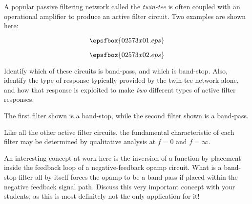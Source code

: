 

A popular passive filtering network called the {\it twin-tee} is often coupled with an operational amplifier to produce an active filter circuit.  Two examples are shown here:

$$\epsfbox{02573x01.eps}$$

$$\epsfbox{02573x02.eps}$$

Identify which of these circuits is band-pass, and which is band-stop.  Also, identify the type of response typically provided by the twin-tee network alone, and how that response is exploited to make {\it two} different types of active filter responses.







The first filter shown is a band-stop, while the second filter shown is a band-pass.







Like all the other active filter circuits, the fundamental characteristic of each filter may be determined by qualitative analysis at $f = 0$ and $f = \infty$.

An interesting concept at work here is the inversion of a function by placement inside the feedback loop of a negative-feedback opamp circuit.  What is a band-stop filter all by itself forces the opamp to be a band-pass if placed within the negative feedback signal path.  Discuss this very important concept with your students, as this is most definitely not the only application for it!





